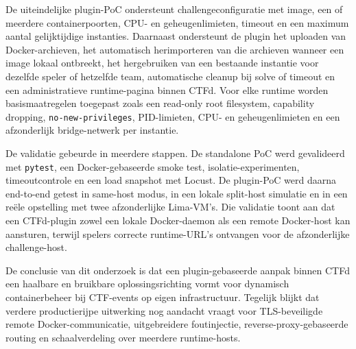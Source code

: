 De uiteindelijke plugin-PoC ondersteunt challengeconfiguratie met image, een of meerdere containerpoorten, CPU- en geheugenlimieten, timeout en een maximum aantal gelijktijdige instanties. Daarnaast ondersteunt de plugin het uploaden van Docker-archieven, het automatisch herimporteren van die archieven wanneer een image lokaal ontbreekt, het hergebruiken van een bestaande instantie voor dezelfde speler of hetzelfde team, automatische cleanup bij solve of timeout en een administratieve runtime-pagina binnen CTFd. Voor elke runtime worden basismaatregelen toegepast zoals een read-only root filesystem, capability dropping, \texttt{no-new-privileges}, PID-limieten, CPU- en geheugenlimieten en een afzonderlijk bridge-netwerk per instantie.

De validatie gebeurde in meerdere stappen. De standalone PoC werd gevalideerd met \texttt{pytest}, een Docker-gebaseerde smoke test, isolatie-experimenten, timeoutcontrole en een load snapshot met Locust. De plugin-PoC werd daarna end-to-end getest in same-host modus, in een lokale split-host simulatie en in een reële opstelling met twee afzonderlijke Lima-VM's. Die validatie toont aan dat een CTFd-plugin zowel een lokale Docker-daemon als een remote Docker-host kan aansturen, terwijl spelers correcte runtime-URL's ontvangen voor de afzonderlijke challenge-host.

De conclusie van dit onderzoek is dat een plugin-gebaseerde aanpak binnen CTFd een haalbare en bruikbare oplossingsrichting vormt voor dynamisch containerbeheer bij CTF-events op eigen infrastructuur. Tegelijk blijkt dat verdere productierijpe uitwerking nog aandacht vraagt voor TLS-beveiligde remote Docker-communicatie, uitgebreidere foutinjectie, reverse-proxy-gebaseerde routing en schaalverdeling over meerdere runtime-hosts.
